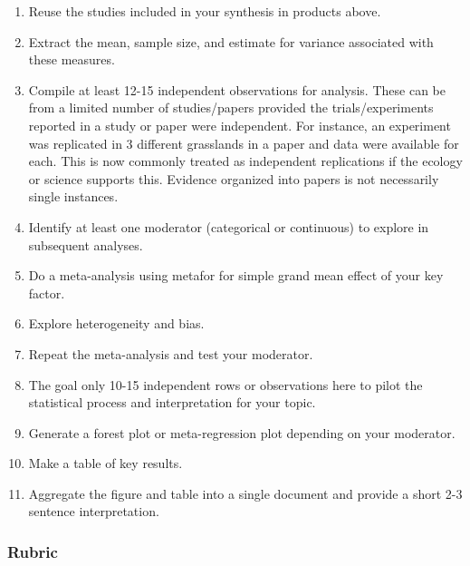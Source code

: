 \documentclass[
]{book}
\providecommand{\tightlist}{%
  \setlength{\itemsep}{0pt}\setlength{\parskip}{0pt}}
\begin{document}
\begin{enumerate}
\def\labelenumi{\arabic{enumi}.}
\tightlist
\item
  Reuse the studies included in your synthesis in products above.\\
\item
  Extract the mean, sample size, and estimate for variance associated with these measures.\\
\item
  Compile at least 12-15 independent observations for analysis. These can be from a limited number of studies/papers provided the trials/experiments reported in a study or paper were independent. For instance, an experiment was replicated in 3 different grasslands in a paper and data were available for each. This is now commonly treated as independent replications if the ecology or science supports this. Evidence organized into papers is not necessarily single instances.\\
\item
  Identify at least one moderator (categorical or continuous) to explore in subsequent analyses.\\
\item
  Do a meta-analysis using metafor for simple grand mean effect of your key factor.\\
\item
  Explore heterogeneity and bias.\\
\item
  Repeat the meta-analysis and test your moderator.\\
\item
  The goal only 10-15 independent rows or observations here to pilot the statistical process and interpretation for your topic.\\
\item
  Generate a forest plot or meta-regression plot depending on your moderator.\\
\item
  Make a table of key results.\\
\item
  Aggregate the figure and table into a single document and provide a short 2-3 sentence interpretation.
\end{enumerate}

\hypertarget{rubric-2}{%
\subsubsection*{Rubric}\label{rubric-2}}
\end{document}
